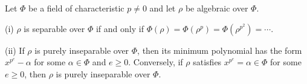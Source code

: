 Let $\Phi$ be a field of characteristic $p \neq 0$ and let $\rho$ be algebraic over $\Phi$.

(i) $\rho$ is separable over $\Phi$ if and only if $\Phi(\rho) = \Phi(\rho^p) = \Phi(\rho^{p^2}) = \cdots$.

(ii) If $\rho$ is purely inseparable over $\Phi$, then its minimum polynomial has the form $x^{p^e} - \alpha$ for some $\alpha \in \Phi$ and $e \geq 0$. Conversely, if $\rho$ satisfies $x^{p^e} = \alpha \in \Phi$ for some $e \geq 0$, then $\rho$ is purely inseparable over $\Phi$.
